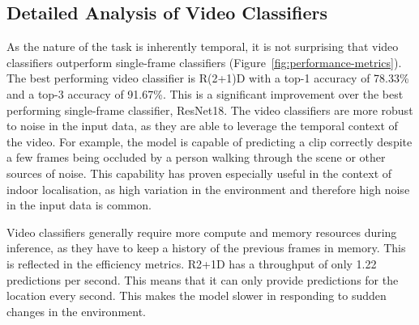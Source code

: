 \documentclass[a4paper]{article}
\begin{document}

  \subsection{Detailed Analysis of Video Classifiers} %
  \label{sub:detailed-analysis-of-video-classifiers}

  As the nature of the task is inherently temporal, it is not surprising that
  video classifiers outperform single-frame classifiers
  (Figure~\ref{fig:performance-metrics}). The best performing video classifier is
  R(2+1)D with a top-1 accuracy of 78.33\% and a top-3 accuracy of 91.67\%. This
  is a significant improvement over the best performing single-frame classifier,
  ResNet18. The video classifiers are more robust to noise in the input data, as
  they are able to leverage the temporal context of the video. For example, the
  model is capable of predicting a clip correctly despite a few frames being
  occluded by a person walking through the scene or other sources of noise. This
  capability has proven especially useful in the context of indoor localisation,
  as high variation in the environment and therefore high noise in the input
  data is common.

  Video classifiers generally require more compute and memory resources during
  inference, as they have to keep a history of the previous frames in memory.
  This is reflected in the efficiency metrics. R2+1D has a throughput of only
  1.22 predictions per second. This means that it can only provide predictions
  for the location every second. This makes the model slower in responding to
  sudden changes in the environment.

\end{document}
